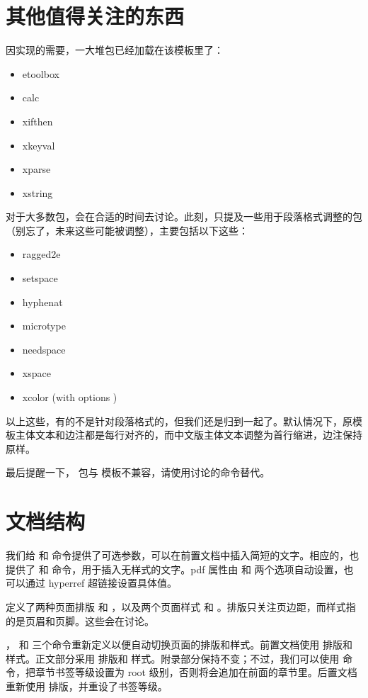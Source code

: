 \section{其他值得关注的东西}

因实现的需要，一大堆包已经加载在该模板里了：

\begin{itemize}
	\item etoolbox
	\item calc
	\item xifthen
	\item xkeyval
	\item xparse
	\item xstring
\end{itemize}

对于大多数包，会在合适的时间去讨论。此刻，只提及一些用于段落格式调整的包（别忘了，未来这些可能被调整），主要包括以下这些：

\begin{itemize}
	\item ragged2e
	\item setspace
	\item hyphenat
	\item microtype
	\item needspace
	\item xspace
	\item xcolor (with options )
\end{itemize}

以上这些，有的不是针对段落格式的，但我们还是归到一起了。默认情况下，原模板主体文本和边注都是每行对齐的，而中文版主体文本调整为首行缩进，边注保持原样。

最后提醒一下， 包与  模板不兼容，请使用讨论的命令替代。

\section{文档结构}

我们给  和  命令提供了可选参数，可以在前置文档中插入简短的文字。相应的，也提供了  和  命令，用于插入无样式的文字。pdf 属性由  和  两个选项自动设置，也可以通过 hyperref 超链接设置具体值。

定义了两种页面排版  和 ，以及两个页面样式  和 。排版只关注页边距，而样式指的是页眉和页脚。这些会在讨论。

， 和  三个命令重新定义以便自动切换页面的排版和样式。前置文档使用  排版和  样式。正文部分采用  排版和  样式。附录部分保持不变；不过，我们可以使用  命令，把章节书签等级设置为 root 级别，否则将会追加在前面的章节里。后置文档重新使用  排版，并重设了书签等级。
